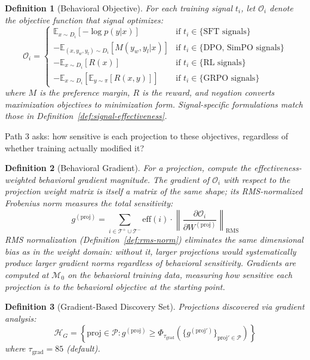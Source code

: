 \documentclass[11pt]{article}
\newtheorem{definition}{Definition}[section]
\begin{document}
\begin{definition}[Behavioral Objective]
\label{def:behavioral-objective}
For each training signal $t_i$, let $\mathcal{O}_i$ denote the objective function that signal optimizes:
\begin{equation}
\mathcal{O}_i = \begin{cases}
\mathbb{E}_{x \sim D_i}[-\log p(y|x)] & \text{if } t_i \in \{\text{SFT signals}\} \\[0.5em]
-\mathbb{E}_{(x,y_w,y_l) \sim D_i}[M(y_w, y_l | x)] & \text{if } t_i \in \{\text{DPO, SimPO signals}\} \\[0.5em]
-\mathbb{E}_{x \sim D_i}[R(x)] & \text{if } t_i \in \{\text{RL signals}\} \\[0.5em]
-\mathbb{E}_{x \sim D_i}[\mathbb{E}_{y \sim \pi}[R(x,y)]] & \text{if } t_i \in \{\text{GRPO signals}\}
\end{cases}
\end{equation}
where $M$ is the preference margin, $R$ is the reward, and negation converts maximization objectives to minimization form. Signal-specific formulations match those in Definition~\ref{def:signal-effectiveness}.
\end{definition}

Path 3 asks: how sensitive is each projection to these objectives, regardless of whether training actually modified it?

\begin{definition}[Behavioral Gradient]
\label{def:behavioral-gradient}
For a projection, compute the effectiveness-weighted behavioral gradient magnitude. The gradient of $\mathcal{O}_i$ with respect to the projection weight matrix is itself a matrix of the same shape; its RMS-normalized Frobenius norm measures the total sensitivity:
\begin{equation}
g^{(\text{proj})} = \sum_{i \in \mathcal{T}^+ \cup \mathcal{T}^-} \text{eff}(i) \cdot \left\|\frac{\partial \mathcal{O}_i}{\partial W^{(\text{proj})}}\right\|_{\text{RMS}}
\end{equation}
RMS normalization (Definition~\ref{def:rms-norm}) eliminates the same dimensional bias as in the weight domain: without it, larger projections would systematically produce larger gradient norms regardless of behavioral sensitivity. Gradients are computed at $\mathcal{M}_0$ on the behavioral training data, measuring how sensitive each projection is to the behavioral objective at the starting point.
\end{definition}

\begin{definition}[Gradient-Based Discovery Set]
\label{def:gradient-based-discovery-set}
Projections discovered via gradient analysis:
\begin{equation}
\mathcal{H}_G = \left\{\text{proj} \in \mathcal{P} : g^{(\text{proj})} \geq \Phi_{\tau_{\text{grad}}}\left(\{g^{(\text{proj}')}\}_{\text{proj}' \in \mathcal{P}}\right)\right\}
\end{equation}
where $\tau_{\text{grad}} = 85$ (default).
\end{definition}
\end{document}
